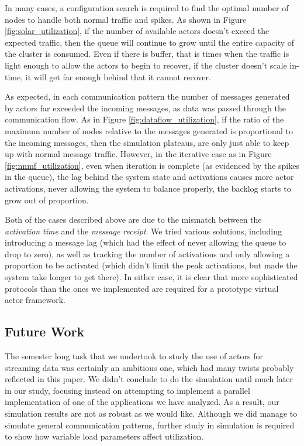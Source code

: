 \documentclass[conference,twocolumn,10pt]{IEEEtran}
\begin{document}
In many cases, a configuration search is required to find the optimal number of nodes to handle both normal traffic and spikes. As shown in Figure \ref{fig:solar_utilization}, if the number of available actors doesn't exceed the expected traffic, then the queue will continue to grow until the entire capacity of the cluster is consumed. Even if there is buffer, that is times when the traffic is light enough to allow the actors to begin to recover, if the cluster doesn't scale in-time, it will get far enough behind that it cannot recover.

As expected, in each communication pattern the number of messages generated by actors far exceeded the incoming messages, as data was passed through the communication flow. As in Figure \ref{fig:dataflow_utilization}, if the ratio of the maximum number of nodes relative to the messages generated is proportional to the incoming messages, then the simulation plateaus, are only just able to keep up with normal message traffic. However, in the iterative case as in Figure \ref{fig:nnmf_utilization}, even when iteration is complete (as evidenced by the spikes in the queue), the lag behind the system state and activations causes more actor activations, never allowing the system to balance properly, the backlog starts to grow out of proportion.

Both of the cases described above are due to the mismatch between the \textit{activation time} and the \textit{message receipt}. We tried various solutions, including introducing a message lag (which had the effect of never allowing the queue to drop to zero), as well as tracking the number of activations and only allowing a proportion to be activated (which didn't limit the peak activations, but made the system take longer to get there). In either case, it is clear that more sophisticated protocols than the ones we implemented are required for a prototype virtual actor framework.

\subsection{Future Work}

The semester long task that we undertook to study the use of actors for streaming data was certainly an ambitious one, which had many twists probably reflected in this paper. We didn't conclude to do the simulation until much later in our study, focusing instead on attempting to implement a parallel implementation of one of the applications we have analyzed. As a result, our simulation results are not as robust as we would like. Although we did manage to simulate general communication patterns, further study in simulation is required to show how variable load parameters affect utilization.
\end{document}
